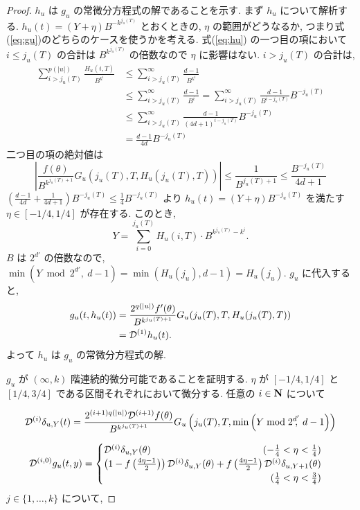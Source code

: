 \begin{proof}
 $h_u$ は $g_u$ の常微分方程式の解であることを示す.
 まず $h_u$ について解析する. 
  $h_u(t) = (Y + \eta) B^{-k^{j_u(T)}}$ とおくときの, $\eta$ の範囲がどうなるか,
  つまり式(\ref{eq:gu})のどちらのケースを使うかを考える.
  式(\ref{eq:hu}) の一つ目の項において
 $i \le j_u(T)$ の合計は $B^{k^{j_u(T)}}$ の倍数なので $\eta$ に影響はない.
  $i > j_u(T)$ の合計は, 
 \begin{align*}
  \sum_{i>j_u(T)}^{p(|u|)} \frac{H_u(i, T)}{B^{k^i}} 
  & \le \sum_{i>j_u(T)}^\infty \frac{d-1}{B^{k^i}}  \\
  & \le \sum_{i>j_u(T)}^\infty \frac{d-1}{B^i} 
   = \sum_{i>j_u(T)}^\infty \frac{d-1}{B^{i-j_u(T)}}B^{-j_u(T)} \\
  & \le \sum_{i>j_u(T)}^\infty \frac{d-1}{(4d+1)^{i-j_u(T)}}B^{-j_u(T)} \\
  & = \frac{d-1}{4d}B^{-j_u(T)}
 \end{align*}
 二つ目の項の絶対値は
 \begin{equation}
  \left| \frac{f(\theta)}{B^{k^{j_u(T)+1}}} G_u(j_u(T), T, H_u(j_u(T), T)) \right|
  \le \frac{1}{B^{j_u(T)+1}}
  \le \frac{B^{-j_u(T)}}{4d+1}
 \end{equation}
 $(\frac{d-1}{4d} + \frac{1}{4d+1})B^{-j_u(T)} \le \frac 1 4 B^{-j_u(T)} $
  より $h_u(t) = (Y + \eta) B^{-j_u(T)}$ を満たす $\eta \in [-1/4, 1/4]$
 が存在する. このとき,
 \begin{equation}
  Y = \sum_{i=0}^{j_u(T)}H_u(i, T) \cdot B^{k^{j_u(T)} - k^i} .
 \end{equation}
 $B$ は $2^{d'}$ の倍数なので, 
 $\min (Y \bmod 2^{d'}\!\!\!,\ d-1) = \min (H_u(j_u), d-1) = H_u(j_u)$. 
 $g_u$ に代入すると,
 \begin{align*}
   g_u(t, h_u(t)) 
  & =  \frac{2^{q(|u|)} f'(\theta)}{B^{k^{j_u(T)+1}}}
   G_u(j_u(T), T, H_u(j_u(T), T)) \\
  & =  \mathcal D^{(1)}h_u(t).
 \end{align*}
 よって $h_u$ は $g_u$ の常微分方程式の解.

  $g_u$ が $(\infty, k)$ 階連続的微分可能であることを証明する.
  $\eta$ が $[-1/4, 1/4]$ と $[1/4, 3/4]$ である区間それぞれにおいて微分する.
  任意の $i \in \mathbf N$ について

  \begin{equation}
   \mathcal D^{(i)}\delta_{u,Y}(t) 
    = \frac{2^{(i+1)q(|u|)} \mathcal D^{(i+1)}f(\theta)}{B^{k^{j_u(T)+1}}}
    G_u\left( j_u(T), T, \min \left(Y \bmod 2^{d'}\!\!\!,\ d-1 \right) \right)
  \end{equation}

  \begin{equation}
   \label{eq:derivativeofgu}
    \D{i,0} g_u(t, y)
     = \begin{cases}
 	\D{i} \delta_{u, Y}(\theta) 
	\hfill (- \frac 1 4 < \eta < \frac 1 4) \\
	\left( 1-f \left(\frac{4\eta-1}{2}\right)\right) 
	\D{i} \delta_{u, Y}(\theta) 
	+ f \left(\frac{4\eta-1}{2}\right) \D{i} \delta_{u,Y+1}(\theta) \\
	\hfill (\frac 1 4 < \eta < \frac 3 4)
       \end{cases}
  \end{equation}   
  $j \in \{1, \dots , k\}$ について,


\end{proof}
